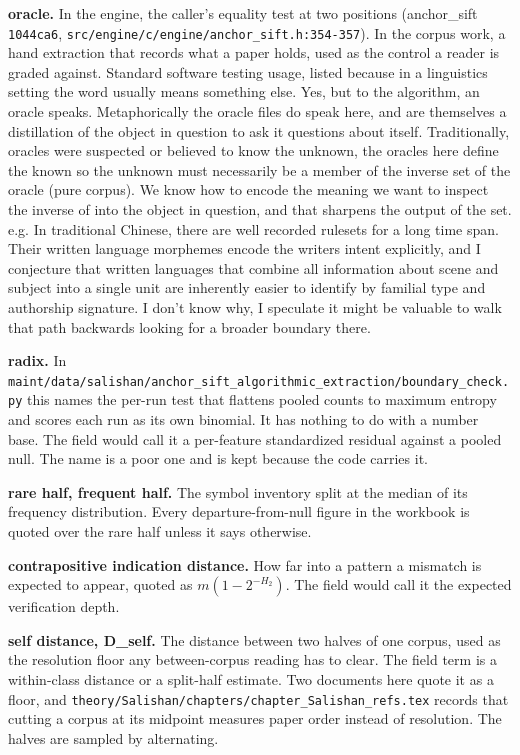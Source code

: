 \noindent\textbf{oracle.} In the engine, the caller's equality test at two positions (anchor\_sift \texttt{1044ca6}, \texttt{src/\allowbreak{}engine/\allowbreak{}c/\allowbreak{}engine/\allowbreak{}anchor\_sift.h:354-357}). In the corpus work, a hand extraction that records what a paper holds, used as the control a reader is graded against. Standard software testing usage, listed because in a linguistics setting the word usually means something else. Yes, but to the algorithm, an oracle speaks. Metaphorically the oracle files do speak here, and are themselves a distillation of the object in question to ask it questions about itself. Traditionally, oracles were suspected or believed to know the unknown, the oracles here define the known so the unknown must necessarily be a member of the inverse set of the oracle (pure corpus). We know how to encode the meaning we want to inspect the inverse of into the object in question, and that sharpens the output of the set. e.g. In traditional Chinese, there are well recorded rulesets for a long time span. Their written language morphemes encode the writers intent explicitly, and I conjecture that written languages that combine all information about scene and subject into a single unit are inherently easier to identify by familial type and authorship signature. I don't know why, I speculate it might be valuable to walk that path backwards looking for a broader boundary there.

\noindent\textbf{radix.} In \texttt{maint/\allowbreak{}data/\allowbreak{}salishan/\allowbreak{}anchor\_\allowbreak{}sift\_\allowbreak{}algorithmic\_\allowbreak{}extraction/\allowbreak{}boundary\_\allowbreak{}check.\allowbreak{}py} this names the per-run test that flattens pooled counts to maximum entropy and scores each run as its own binomial. It has nothing to do with a number base. The field would call it a per-feature standardized residual against a pooled null. The name is a poor one and is kept because the code carries it.

\noindent\textbf{rare half, frequent half.} The symbol inventory split at the median of its frequency distribution. Every departure-from-null figure in the workbook is quoted over the rare half unless it says otherwise.

\noindent\textbf{contrapositive indication distance.} How far into a pattern a mismatch is expected to appear, quoted as \(m(1-2^{-H_2})\). The field would call it the expected verification depth.

\noindent\textbf{self distance, D\_self.} The distance between two halves of one corpus, used as the resolution floor any between-corpus reading has to clear. The field term is a within-class distance or a split-half estimate. Two documents here quote it as a floor, and \texttt{theory/\allowbreak{}Salishan/\allowbreak{}chapters/\allowbreak{}chapter\_\allowbreak{}Salishan\_\allowbreak{}refs.\allowbreak{}tex} records that cutting a corpus at its midpoint measures paper order instead of resolution. The halves are sampled by alternating.

